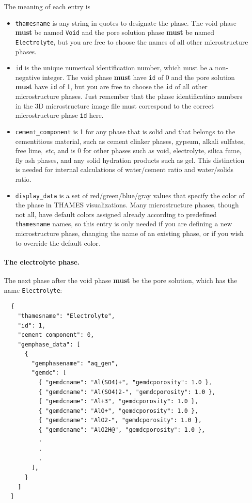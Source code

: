 \documentclass{article}
\begin{document}
{\normalsize{ }
The meaning of each entry is
\begin{itemize}
	\item \verb!thamesname! is any string in quotes to designate the phase.
	      The void phase \textbf{must} be named \verb!Void! and the pore
	      solution phase \textbf{must} be named \verb!Electrolyte!, but
	      you are free to choose the names of all other microstructure phases.
	\item  \verb!id! is the unique numerical identification number, which
	      must be a non-negative integer. The void phase \textbf{must} have
	      \verb!id! of 0 and the pore solution \textbf{must} have
	      \verb!id! of 1, but you are free to choose the \verb!id!
	      of all other microstructure phases. Just remember that the phase
	      identificatino numbers in the 3D microstructure image file must
	      correspond to the correct microstructure phase \verb!id! here.
	\item \verb!cement_component! is 1 for any phase that is solid and
	      that belongs to the cementitious material, such as cement clinker phases, gypsum,
	      alkali sulfates, free lime, \textit{etc}, and is 0 for other
	      phases such as void, electrolyte, silica fume, fly ash phases, and
	      any solid hydration products such as  gel. This distinction
	      is needed for internal calculations of water/cement ratio and
	      water/solids ratio.
	\item \verb!display_data! is a set of red/green/blue/gray values
	      that specify the color of the phase in THAMES visualizations. Many
	      microstructure phases, though not all, have default colors assigned
	      already according to predefined \verb!thamesname! names, so this entry
	      is only needed if you are defining a new
	      microstructure phase, changing the name of an existing phase,
	      or if you wish to override the default color.
\end{itemize}

\paragraph{The electrolyte phase.} The next phase after the void phase
\textbf{must} be the pore solution, which has the name \verb!Electrolyte!:
\scriptsize{
	\begin{lstlisting}
  {
    "thamesname": "Electrolyte",
    "id": 1,
    "cement_component": 0,
    "gemphase_data": [
      {
        "gemphasename": "aq_gen",
        "gemdc": [
          { "gemdcname": "Al(SO4)+", "gemdcporosity": 1.0 },
          { "gemdcname": "Al(SO4)2-", "gemdcporosity": 1.0 },
          { "gemdcname": "Al+3", "gemdcporosity": 1.0 },
          { "gemdcname": "AlO+", "gemdcporosity": 1.0 },
          { "gemdcname": "AlO2-", "gemdcporosity": 1.0 },
          { "gemdcname": "AlO2H@", "gemdcporosity": 1.0 },
          .
          .
          .
        ],
      }
    ]
  }
\end{lstlisting}
}

}
\end{document}
